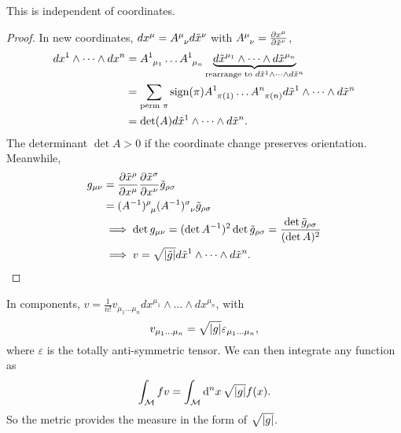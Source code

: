 \begin{claim}
  This is independent of coordinates.
\end{claim}
\begin{proof}
  In new coordinates, $dx^\mu = A \indices{^\mu_\nu} d \tilde x^\nu$ with $A \indices{^\mu_\nu} = \pdv{x^\mu}{\tilde x^\nu}$, 
  \begin{align}
    dx^1 \wedge \dots \wedge dx^n &= A \indices{^1_{\mu_1}} \dots A \indices{^1_{\mu_n}} \underbrace{d\tilde x^{\mu_1} \wedge \dots \wedge d \tilde x^{\mu_n}}_{\text{rearrange to } d\tilde x^1 \wedge \dots \wedge d\tilde x^n} \\
				  &= \sum_{\text{perm }\pi} \text{sign}(\pi) A \indices{^1_{\pi(1)}} \dots A \indices{^n_{\pi(n)}} d \tilde x^1 \wedge \dots \wedge d \tilde x^n \\
				  &= \text{det}(A) d\tilde x^1 \wedge \dots \wedge d\tilde x^n.
  \end{align}
  The determinant $\det A > 0$ if the coordinate change preserves orientation.
  Meanwhile, 
  \begin{align}
    g_{\mu\nu} &= \pdv{\tilde x^\rho}{x^\mu} \pdv{\tilde x^\sigma}{x^\nu} \tilde g_{\rho\sigma} \\
	       &= (A^{-1}) \indices{^\rho_\mu} (A^{-1}) \indices{^\sigma_\nu} \tilde g_{\rho\sigma} \\
	       &\implies \det g_{\mu\nu} = (\det A^{-1})^2 \det \tilde g_{\rho\sigma} = \frac{\det \tilde g_{\rho\sigma}}{(\det A)^2} \\
	       &\implies v = \sqrt{\abs{\tilde g}} d\tilde x^1 \wedge \dots \wedge d\tilde x^n.
  \end{align}
\end{proof}
In components, $v = \frac{1}{n!} v_{\mu_1 \dots \mu_n} d x^{\mu_1} \wedge \dots \wedge d x^{\mu_n}$, with
\begin{equation}
  v_{\mu_1 \dots \mu_n} = \sqrt{ \abs{g}} \varepsilon_{\mu_1 \dots \mu_n},
\end{equation}
where $\varepsilon$ is the totally anti-symmetric tensor.
We can then integrate any function as
\begin{equation}
  \int_{\mathcal{M}} f v = \int_{\mathcal{M}} \dd[n]{x} \sqrt{\abs{g}} f(x).
\end{equation}
So the metric provides the measure in the form of $\sqrt{\abs{g}}$.
